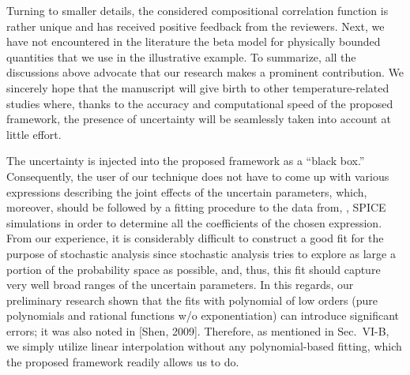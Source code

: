\begin{authors}
Turning to smaller details, the considered compositional correlation function is rather unique and has received positive feedback from the reviewers.
Next, we have not encountered in the literature the beta model for physically bounded quantities that we use in the illustrative example.
To summarize, all the discussions above advocate that our research makes a prominent contribution.
We sincerely hope that the manuscript will give birth to other temperature-related studies where, thanks to the accuracy and computational speed of the proposed framework, the presence of uncertainty will be seamlessly taken into account at little effort.

The uncertainty is injected into the proposed framework as a ``black box.''
Consequently, the user of our technique does not have to come up with various expressions describing the joint effects of the uncertain parameters, which, moreover, should be followed by a fitting procedure to the data from, \eg, SPICE simulations in order to determine all the coefficients of the chosen expression.
From our experience, it is considerably difficult to construct a good fit for the purpose of stochastic analysis since stochastic analysis tries to explore as large a portion of the probability space as possible, and, thus, this fit should capture very well broad ranges of the uncertain parameters.
In this regards, our preliminary research shown that the fits with polynomial of low orders (pure polynomials and rational functions w/o exponentiation) can introduce significant errors; it was also noted in [Shen, 2009].
Therefore, as mentioned in Sec.~VI-B, we simply utilize linear interpolation without any polynomial-based fitting, which the proposed framework readily allows us to do.
\end{authors}

